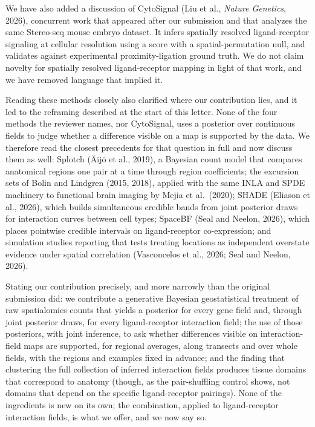 \documentclass[11pt]{article}
\begin{document}
We have also added a discussion of CytoSignal (Liu et al., \emph{Nature Genetics}, 2026),
concurrent work that appeared after our submission and that analyzes the same Stereo-seq
mouse embryo dataset. It infers spatially resolved ligand-receptor signaling at cellular
resolution using a score with a spatial-permutation null, and validates against experimental
proximity-ligation ground truth. We do not claim novelty for spatially resolved
ligand-receptor mapping in light of that work, and we have removed language that implied it.

Reading these methods closely also clarified where our contribution lies, and it led to the
reframing described at the start of this letter. None of the four methods the reviewer names,
nor CytoSignal, uses a posterior over continuous fields to judge whether a difference visible on
a map is supported by the data. We therefore read the closest precedents for that question in
full and now discuss them as well: Splotch (\"Aij\"o et al., 2019), a Bayesian count model that
compares anatomical regions one pair at a time through region coefficients; the excursion sets of
Bolin and Lindgren (2015, 2018), applied with the same INLA and SPDE machinery to functional brain
imaging by Mejia et al.\ (2020); SHADE (Eliason et al., 2026), which builds simultaneous credible
bands from joint posterior draws for interaction curves between cell types; SpaceBF (Seal and
Neelon, 2026), which places pointwise credible intervals on ligand-receptor co-expression; and
simulation studies reporting that tests treating locations as independent overstate evidence
under spatial correlation (Vasconcelos et al., 2026; Seal and Neelon, 2026).

Stating our contribution precisely, and more narrowly than the original submission did: we
contribute a generative Bayesian geostatistical treatment of raw spatialomics counts that yields a
posterior for every gene field and, through joint posterior draws, for every ligand-receptor
interaction field; the use of those posteriors, with joint inference, to ask whether differences
visible on interaction-field maps are supported, for regional averages, along transects and over
whole fields, with the regions and examples fixed in advance; and the finding that clustering the
full collection of inferred interaction fields produces tissue domains that correspond to anatomy
(though, as the pair-shuffling control shows, not domains that depend on the specific
ligand-receptor pairings). None of the ingredients is new on its own; the combination, applied to
ligand-receptor interaction fields, is what we offer, and we now say so.
\end{document}
